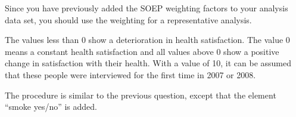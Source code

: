 \documentclass[letterpaper,10pt,openany,onesideH,english]{sphinxmanual}
\begin{document}
\begin{figure}[H]
\centering

\noindent{}
\end{figure}

Since you have previously added the SOEP weighting factors to your analysis data set, you should use the weighting for a representative analysis.

%
\begin{sphinxVerbatim}[commandchars=\\\{\},numbers=left,firstnumber=1,stepnumber=1]
	    \PYG{p}{[}\PYG{p}{]}	
\end{sphinxVerbatim}

\begin{figure}[H]
\centering

\noindent{}
\end{figure}

The values less than 0 show a deterioration in health satisfaction. The value 0 means a constant health satisfaction and all values above 0 show a positive change in satisfaction with their health. With a value of 10, it can be assumed that these people were interviewed for the first time in 2007 or 2008.


The procedure is similar to the previous question, except that the element “smoke yes/no” is added.
\end{document}
